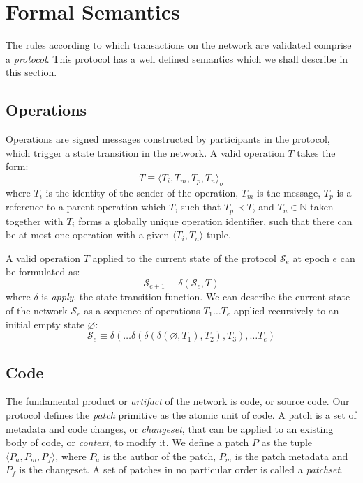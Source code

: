 \section{Formal Semantics}

The rules according to which transactions on the \oscoin{} network are
validated comprise a \emph{protocol}. This protocol has a well defined semantics
which we shall describe in this section.

\subsection{Operations}

Operations are signed messages constructed by participants in the protocol,
which trigger a state transition in the network. A valid operation $T$ takes
the form:
\[
    T \equiv \langle T_i, T_m, T_p, T_n \rangle_{\sigma}
\]
where $T_i$ is the identity of the sender of the operation, $T_m$ is the
message, $T_p$ is a reference to a parent operation which $T$, such that $T_p
\prec T$, and $T_n \in \mathbb{N}$ taken together with $T_i$ forms a globally
unique operation identifier, such that there can be at most one operation with
a given $\langle T_i, T_n \rangle$ tuple.

A valid operation $T$ applied to the current state of
the protocol $\mathcal{S}_e$ at epoch $e$ can be formulated as:
\[
    \mathcal{S}_{e+1} \equiv \delta(\mathcal{S}_e, T)
\]
where $\delta$ is \emph{apply}, the state-transition function.  We can
describe the current state of the network $\mathcal{S}_e$ as a sequence of
operations ${T_1 \dots T_e}$ applied recursively to an initial empty state
$\varnothing$:
\[
    \mathcal{S}_e \equiv \delta(\dots \delta(\delta(\delta(\varnothing,
    T_1), T_2), T_3), \dots T_e)
\]

\subsection{Code} The fundamental product or \emph{artifact} of the \oscoin{}
network is code, or source code. Our protocol defines the \emph{patch}
primitive as the atomic unit of code. A patch is a set of metadata and code
changes, or \emph{changeset}, that can be applied to an existing body of code,
or \emph{context}, to modify it. We define a patch $P$ as the tuple $\langle
P_a, P_m, P_f \rangle$, where $P_a$ is the author of the patch, $P_m$ is the
patch metadata and $P_f$ is the changeset. A set of patches in no particular
order is called a \emph{patchset}.


